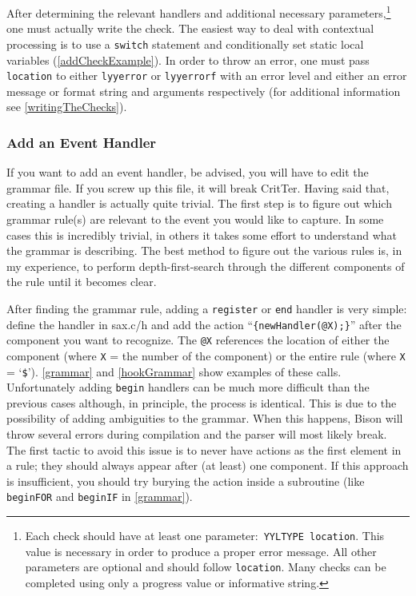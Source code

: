\documentclass[12pt]{report}
\newcommand{\programName}{CritTer\xspace}
\begin{document}
After determining the relevant handlers and additional necessary parameters,\footnote{Each check 
should have at least one parameter:\ \lstinline{YYLTYPE location}. This value is necessary in order to 
produce a proper error message. All other parameters are optional and should follow \lstinline{location}. 
Many checks can be completed using only a progress value or informative string.} one must actually 
write the check. The easiest way to deal with contextual processing is to use a \lstinline{switch} 
statement and conditionally set static local variables (\autoref{addCheckExample}). In order to 
throw an error, one must pass \lstinline{location} to either \lstinline{lyyerror} or \lstinline{lyyerrorf} with an 
error level and either an error message or format string and arguments respectively (for additional 
information see \autoref{writingTheChecks}).

\subsubsection{Add an Event Handler}

If you want to add an event handler, be advised, you will have to edit the grammar file. If you screw up 
this file, it will break \programName. Having said that, creating a handler is actually quite trivial. The first 
step is to figure out which grammar rule(s) are relevant to the event you would like to capture. In some 
cases this is incredibly trivial, in others it takes some effort to understand what the grammar is describing. 
The best method to figure out the various rules is, in my experience, to perform depth-first-search through 
the different components of the rule until it becomes clear. 

After finding the grammar rule, adding a \lstinline{register} or \lstinline{end} handler is very simple: 
define the handler in sax.c/h and add the action ``\lstinline!{newHandler(@X);}!'' after the component you 
want to recognize. The \lstinline{@X} references the location of either the component (where \lstinline{X} 
= the number of the component) or the entire rule (where \lstinline{X} = `\lstinline{$}'). \autoref{grammar}
 and \autoref{hookGrammar} show examples of these calls. Unfortunately adding 
\lstinline{begin} handlers can be much more difficult than the previous cases although, in principle, the 
process is identical. This is due to the possibility of adding ambiguities to the grammar. When this 
happens, Bison will throw several errors during compilation and the parser will most likely break. The 
first tactic to avoid this issue is to never have actions as the first element in a rule; they should always 
appear after (at least) one component. If this approach is insufficient, you should try burying the 
action inside a subroutine (like \lstinline{beginFOR} and \lstinline{beginIF} in \autoref{grammar}).
\end{document}

